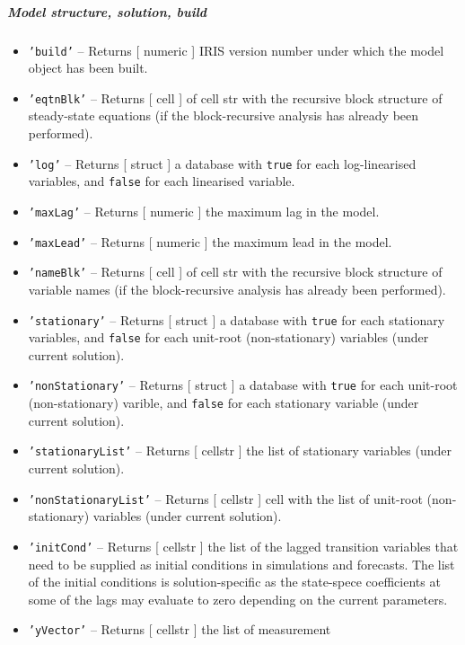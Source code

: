 \subparagraph{Model structure, solution,
build}\label{model-structure-solution-build}

\begin{itemize}
\item
  \texttt{'build'} -- Returns {[} numeric {]} IRIS version number under
  which the model object has been built.
\item
  \texttt{'eqtnBlk'} -- Returns {[} cell {]} of cell str with the
  recursive block structure of steady-state equations (if the
  block-recursive analysis has already been performed).
\item
  \texttt{'log'} -- Returns {[} struct {]} a database with \texttt{true}
  for each log-linearised variables, and \texttt{false} for each
  linearised variable.
\item
  \texttt{'maxLag'} -- Returns {[} numeric {]} the maximum lag in the
  model.
\item
  \texttt{'maxLead'} -- Returns {[} numeric {]} the maximum lead in the
  model.
\item
  \texttt{'nameBlk'} -- Returns {[} cell {]} of cell str with the
  recursive block structure of variable names (if the block-recursive
  analysis has already been performed).
\item
  \texttt{'stationary'} -- Returns {[} struct {]} a database with
  \texttt{true} for each stationary variables, and \texttt{false} for
  each unit-root (non-stationary) variables (under current solution).
\item
  \texttt{'nonStationary'} -- Returns {[} struct {]} a database with
  \texttt{true} for each unit-root (non-stationary) varible, and
  \texttt{false} for each stationary variable (under current solution).
\item
  \texttt{'stationaryList'} -- Returns {[} cellstr {]} the list of
  stationary variables (under current solution).
\item
  \texttt{'nonStationaryList'} -- Returns {[} cellstr {]} cell with the
  list of unit-root (non-stationary) variables (under current solution).
\item
  \texttt{'initCond'} -- Returns {[} cellstr {]} the list of the lagged
  transition variables that need to be supplied as initial conditions in
  simulations and forecasts. The list of the initial conditions is
  solution-specific as the state-spece coefficients at some of the lags
  may evaluate to zero depending on the current parameters.
\item
  \texttt{'yVector'} -- Returns {[} cellstr {]} the list of measurement

\end{itemize}
